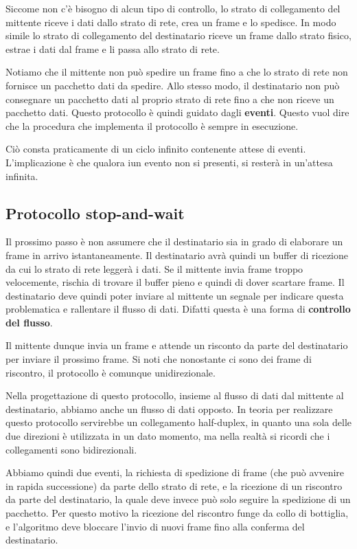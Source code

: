         Siccome non c'è bisogno di alcun tipo di controllo, lo strato di collegamento del mittente riceve i dati dallo strato di rete, crea un frame e lo spedisce. In modo simile lo strato di collegamento del destinatario riceve un frame dallo strato fisico, estrae i dati dal frame e li passa allo strato di rete.
        
        Notiamo che il mittente non può spedire un frame fino a che lo strato di rete non fornisce un pacchetto dati da spedire. Allo stesso modo, il destinatario non può consegnare un pacchetto dati al proprio strato di rete fino a che non riceve un pacchetto dati. Questo protocollo è quindi guidato dagli \textbf{eventi}. Questo vuol dire che la procedura che implementa il protocollo è sempre in esecuzione.
        
        Ciò consta praticamente di un ciclo infinito contenente attese di eventi. L'implicazione è che qualora iun evento non si presenti, si resterà in un'attesa infinita.
        
    \subsection{Protocollo stop-and-wait}
        Il prossimo passo è non assumere che il destinatario sia in grado di elaborare un frame in arrivo istantaneamente. Il destinatario avrà quindi un buffer di ricezione da cui lo strato di rete leggerà i dati. Se il mittente invia frame troppo velocemente, rischia di trovare il buffer pieno e quindi di dover scartare frame. Il destinatario deve quindi poter inviare al mittente un segnale per indicare questa problematica e rallentare il flusso di dati. Difatti questa è una forma di \textbf{controllo del flusso}.
        
        Il mittente dunque invia un frame e attende un risconto da parte del destinatario per inviare il prossimo frame. Si noti che nonostante ci sono dei frame di riscontro, il protocollo è comunque unidirezionale.
        
        Nella progettazione di questo protocollo, insieme al flusso di dati dal mittente al destinatario, abbiamo anche un flusso di dati opposto. In teoria per realizzare questo protocollo servirebbe un collegamento half-duplex, in quanto una sola delle due direzioni è utilizzata in un dato momento, ma nella realtà si ricordi che i collegamenti sono bidirezionali.
        
        Abbiamo quindi due eventi, la richiesta di spedizione di frame (che può avvenire in rapida successione) da parte dello strato di rete, e la ricezione di un riscontro da parte del destinatario, la quale deve invece può solo seguire la spedizione di un pacchetto. Per questo motivo la ricezione del riscontro funge da collo di bottiglia, e l'algoritmo deve bloccare l'invio di nuovi frame fino alla conferma del destinatario.
        
